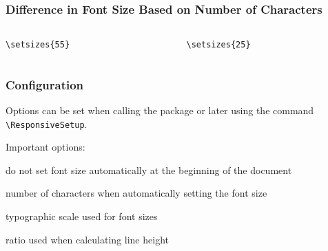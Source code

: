 \begin{frame}[fragile]
  \frametitle{Difference in Font Size Based on Number of Characters}
\begin{columns}
  \begin{column}{0.5\textwidth}
\begin{verbatim}
\setsizes{55}
\end{verbatim}

\end{column}
\begin{column}{0.5\textwidth}
\begin{verbatim}
\setsizes{25}
\end{verbatim}

\end{column}
\end{columns}
\end{frame}

\begin{frame}[fragile]
  \frametitle{Configuration}
  Options can be set when calling the package or later using the command \verb|\ResponsiveSetup|.

  \bigskip

  \begin{block}{Important options:}

  \begin{description}[noautomatic]
    \item[noautomatic] do not set font size automatically at the beginning of the document
    \item[characters] number of characters when automatically setting the font size
    \item[scale] typographic scale used for font sizes
    \item[lineratio] ratio used when calculating line height
  \end{description}
\end{block}

\end{frame}


